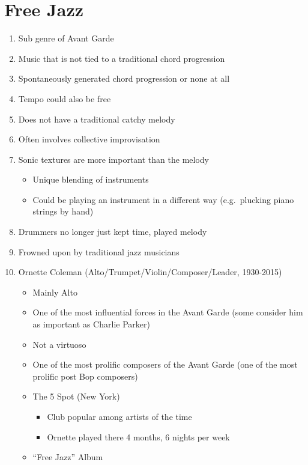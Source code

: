 \documentclass[]{article}
\providecommand{\tightlist}{%
  \setlength{\itemsep}{0pt}\setlength{\parskip}{0pt}}
\begin{document}
\section{Free Jazz}\label{free-jazz}

\begin{enumerate}
\def\labelenumi{\arabic{enumi}.}
\tightlist
\item
  Sub genre of Avant Garde
\item
  Music that is not tied to a traditional chord progression
\item
  Spontaneously generated chord progression or none at all
\item
  Tempo could also be free
\item
  Does not have a traditional catchy melody
\item
  Often involves collective improvisation
\item
  Sonic textures are more important than the melody

  \begin{itemize}
  \tightlist
  \item
    Unique blending of instruments
  \item
    Could be playing an instrument in a different way (e.g.~plucking
    piano strings by hand)
  \end{itemize}
\item
  Drummers no longer just kept time, played melody
\item
  Frowned upon by traditional jazz musicians
\item
  Ornette Coleman (Alto/Trumpet/Violin/Composer/Leader, 1930-2015)

  \begin{itemize}
  \tightlist
  \item
    Mainly Alto
  \item
    One of the most influential forces in the Avant Garde (some consider
    him as important as Charlie Parker)
  \item
    Not a virtuoso
  \item
    One of the most prolific composers of the Avant Garde (one of the
    most prolific post Bop composers)
  \item
    The 5 Spot (New York)

    \begin{itemize}
    \tightlist
    \item
      Club popular among artists of the time
    \item
      Ornette played there 4 months, 6 nights per week
    \end{itemize}
  \item
    ``Free Jazz'' Album


\end{itemize}
\end{enumerate}
\end{document}

